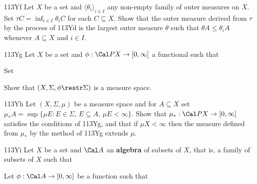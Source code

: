 {\spheader 113Yf Let $X$ be a set and
$\langle\theta_i\rangle_{i\in I}$ any non-empty family of outer measures
on $X$.   Set $\tau C=\inf_{i\in I}\theta_iC$ for each 
$C\subseteq X$.   Show that the outer measure derived from $\tau$ by the
process of 113Yd is the largest outer measure $\theta$ such that
$\theta A\le\theta_iA$ whenever $A\subseteq X$ and $i\in I$.

\spheader 113Yg Let $X$ be a set and $\phi:\Cal PX\to[0,\infty]$
a functional such that


\noindent Set


\noindent Show that $(X,\Sigma,\phi\restr\Sigma)$ is a measure space.

\spheader 113Yh Let $(X,\Sigma,\mu)$ be a measure space and for
$A\subseteq X$ set
$\mu_*A=\sup\{\mu E:E\in\Sigma$, $E\subseteq A$, $\mu E<\infty\}$.
Show that $\mu_*:\Cal PX\to[0,\infty]$ satisfies the
conditions of
113Yg, and that if $\mu X<\infty$ then the measure defined from $\mu_*$
by the method of 113Yg extends $\mu$.

\spheader 113Yi Let $X$ be a set and $\Cal A$ an {\bf algebra}
of subsets of $X$, that is, a family of subsets of $X$ such that


\noindent Let $\phi:\Cal A\to[0,\infty]$ be a function such that


}
